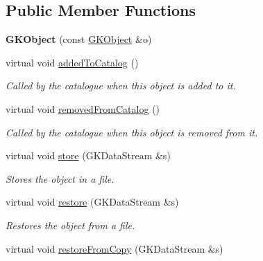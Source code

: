 \subsection*{Public Member Functions}
\begin{DoxyCompactItemize}
\item 
{\bfseries G\+K\+Object} (const \hyperlink{classGKObject}{G\+K\+Object} \&o)\hypertarget{classGKObject_a82545d9836efe1fb18f711087110fe2d}{}\label{classGKObject_a82545d9836efe1fb18f711087110fe2d}

\item 
virtual void \hyperlink{classGKObject_a9ee62f3b50ef85349f812f34ad534801}{added\+To\+Catalog} ()\hypertarget{classGKObject_a9ee62f3b50ef85349f812f34ad534801}{}\label{classGKObject_a9ee62f3b50ef85349f812f34ad534801}

\begin{DoxyCompactList}\small\item\em Called by the catalogue when this object is added to it. \end{DoxyCompactList}\item 
virtual void \hyperlink{classGKObject_ab5f3d4044907b3b1aef653575981eeab}{removed\+From\+Catalog} ()\hypertarget{classGKObject_ab5f3d4044907b3b1aef653575981eeab}{}\label{classGKObject_ab5f3d4044907b3b1aef653575981eeab}

\begin{DoxyCompactList}\small\item\em Called by the catalogue when this object is removed from it. \end{DoxyCompactList}\item 
virtual void \hyperlink{classGKObject_a81a2e8cee6d6d6d59ab57683310732ea}{store} (G\+K\+Data\+Stream \&s)\hypertarget{classGKObject_a81a2e8cee6d6d6d59ab57683310732ea}{}\label{classGKObject_a81a2e8cee6d6d6d59ab57683310732ea}

\begin{DoxyCompactList}\small\item\em Stores the object in a file. \end{DoxyCompactList}\item 
virtual void \hyperlink{classGKObject_a94de210200c6b594d903984ba1bb55d9}{restore} (G\+K\+Data\+Stream \&s)\hypertarget{classGKObject_a94de210200c6b594d903984ba1bb55d9}{}\label{classGKObject_a94de210200c6b594d903984ba1bb55d9}

\begin{DoxyCompactList}\small\item\em Restores the object from a file. \end{DoxyCompactList}\item 
virtual void \hyperlink{classGKObject_a7931e3a71ea833111d2c5992a51094ca}{restore\+From\+Copy} (G\+K\+Data\+Stream \&s)\hypertarget{classGKObject_a7931e3a71ea833111d2c5992a51094ca}{}\label{classGKObject_a7931e3a71ea833111d2c5992a51094ca}


\end{DoxyCompactItemize}
